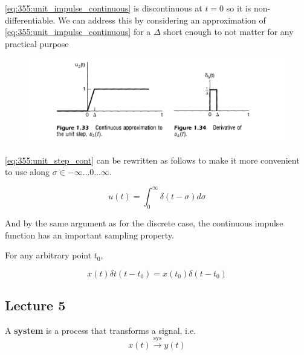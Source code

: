 \documentclass[../notes.tex]{subfiles}
\begin{document}
\eqref{eq:355:unit_impulse_continuous} is discontinuous at $ t=0 $ so it is non-differentiable. We can address this by considering an approximation of \eqref{eq:355:unit_impulse_continuous} for a $ \Delta $ short enough to not matter for any practical purpose

\begin{figure}[H]
	\centering
	\includegraphics[width=0.8\linewidth]{img/image_2022-09-16-16-53-20.png}
\end{figure}


\eqref{eq:355:unit_step_cont} can be rewritten as follows to make it more convenient to use along $ \sigma\in-\infty\ldots 0\ldots\infty$. 

\begin{equation}
	u(t) = \int^{\infty}_0 \delta(t-\sigma) d\sigma
\end{equation}

\begin{theorem}
	
And by the same argument as for the discrete case, the continuous impulse function has an important sampling property.

	For any arbitrary point $ t_0 $,

	\begin{equation}
		x(t) \delta t(t-t_0) = x(t_0)\delta(t-t_0)
	\end{equation}

\end{theorem}

\subsection{Lecture 5}


\begin{definition}
	A \textbf{system} is a process that transforms a signal, i.e. 
	\begin{equation}
		x(t) \xrightarrow{\text{sys}} y(t)
	\end{equation}

	
\end{definition}
\end{document}
